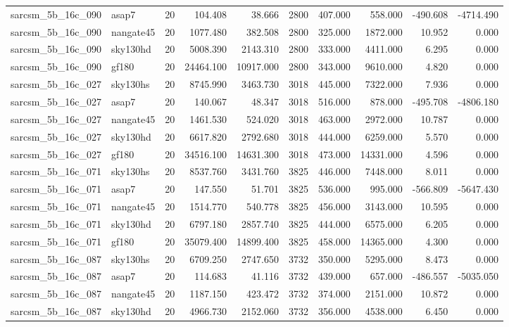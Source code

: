 \documentclass{article}
\begin{document}
\begin{longtable}{llrrrrrrrr}
sarcsm\_5b\_16c\_090 & asap7 & 20 & 104.408 & 38.666 & 2800 & 407.000 & 558.000 & -490.608 & -4714.490 \\
sarcsm\_5b\_16c\_090 & nangate45 & 20 & 1077.480 & 382.508 & 2800 & 325.000 & 1872.000 & 10.952 & 0.000 \\
sarcsm\_5b\_16c\_090 & sky130hd & 20 & 5008.390 & 2143.310 & 2800 & 333.000 & 4411.000 & 6.295 & 0.000 \\
sarcsm\_5b\_16c\_090 & gf180 & 20 & 24464.100 & 10917.000 & 2800 & 343.000 & 9610.000 & 4.820 & 0.000 \\
sarcsm\_5b\_16c\_027 & sky130hs & 20 & 8745.990 & 3463.730 & 3018 & 445.000 & 7322.000 & 7.936 & 0.000 \\
sarcsm\_5b\_16c\_027 & asap7 & 20 & 140.067 & 48.347 & 3018 & 516.000 & 878.000 & -495.708 & -4806.180 \\
sarcsm\_5b\_16c\_027 & nangate45 & 20 & 1461.530 & 524.020 & 3018 & 463.000 & 2972.000 & 10.787 & 0.000 \\
sarcsm\_5b\_16c\_027 & sky130hd & 20 & 6617.820 & 2792.680 & 3018 & 444.000 & 6259.000 & 5.570 & 0.000 \\
sarcsm\_5b\_16c\_027 & gf180 & 20 & 34516.100 & 14631.300 & 3018 & 473.000 & 14331.000 & 4.596 & 0.000 \\
sarcsm\_5b\_16c\_071 & sky130hs & 20 & 8537.760 & 3431.760 & 3825 & 446.000 & 7448.000 & 8.011 & 0.000 \\
sarcsm\_5b\_16c\_071 & asap7 & 20 & 147.550 & 51.701 & 3825 & 536.000 & 995.000 & -566.809 & -5647.430 \\
sarcsm\_5b\_16c\_071 & nangate45 & 20 & 1514.770 & 540.778 & 3825 & 456.000 & 3143.000 & 10.595 & 0.000 \\
sarcsm\_5b\_16c\_071 & sky130hd & 20 & 6797.180 & 2857.740 & 3825 & 444.000 & 6575.000 & 6.205 & 0.000 \\
sarcsm\_5b\_16c\_071 & gf180 & 20 & 35079.400 & 14899.400 & 3825 & 458.000 & 14365.000 & 4.300 & 0.000 \\
sarcsm\_5b\_16c\_087 & sky130hs & 20 & 6709.250 & 2747.650 & 3732 & 350.000 & 5295.000 & 8.473 & 0.000 \\
sarcsm\_5b\_16c\_087 & asap7 & 20 & 114.683 & 41.116 & 3732 & 439.000 & 657.000 & -486.557 & -5035.050 \\
sarcsm\_5b\_16c\_087 & nangate45 & 20 & 1187.150 & 423.472 & 3732 & 374.000 & 2151.000 & 10.872 & 0.000 \\
sarcsm\_5b\_16c\_087 & sky130hd & 20 & 4966.730 & 2152.060 & 3732 & 356.000 & 4538.000 & 6.450 & 0.000 \\

\end{longtable}
\end{document}
